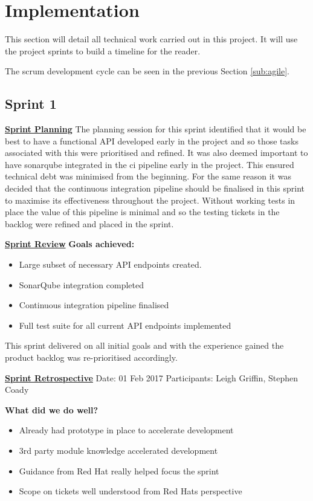 \section{Implementation}
\label{sec:implementation}
This section will detail all technical work carried out in this project. It will use the project \glspl{sprint} to build a timeline for the reader. 

The scrum development cycle can be seen in the previous Section \ref{sub:agile}.

\subsection{Sprint 1}
\underline{\textbf{Sprint Planning}}\newline
The planning session for this sprint identified that it would be best to have a functional API developed early in the project and so those tasks associated with this were prioritised and refined. It was also deemed important to have \gls{sonarqube} integrated in the \gls{ci} pipeline early in the project. This ensured \gls{technical debt} was minimised from the beginning. For the same reason it was decided that the continuous integration pipeline should be finalised in this sprint to maximise its effectiveness throughout the project. Without working tests in place the value of this pipeline is minimal and so the testing tickets in the backlog were refined and placed in the sprint.

\underline{\textbf{Sprint Review}}\newline
\textbf{Goals achieved:}
\begin{itemize}
	\item Large subset of necessary API endpoints created.
	\item SonarQube integration completed
	\item Continuous integration pipeline finalised
	\item Full test suite for all current API endpoints implemented
\end{itemize}

This sprint delivered on all initial goals and with the experience gained the product \gls{backlog} was re-prioritised accordingly.

\underline{\textbf{Sprint Retrospective}}\newline
Date: 01 Feb 2017\newline
Participants: Leigh Griffin, Stephen Coady

\textbf{What did we do well?}
\begin{itemize}
	\item Already had prototype in place to accelerate development
	\item 3rd party module knowledge accelerated development
	\item Guidance from Red Hat really helped focus the sprint
	\item Scope on tickets well understood from Red Hats perspective
\end{itemize}

